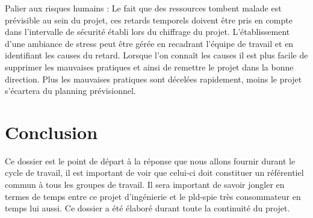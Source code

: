 Palier aux risques humains : Le fait que des ressources tombent malade est prévisible au sein du projet, ces retards temporels doivent être pris en compte dans l'intervalle de sécurité établi lors du chiffrage du projet. L'établissement d'une ambiance de stress peut être gérée en recadrant l'équipe de travail et en identifiant les causes du retard. Lorsque l'on connaît les causes il est plus facile de supprimer les mauvaises pratiques et ainsi de remettre le projet dans la bonne direction. Plus les mauvaises pratiques sont décelées rapidement, moins le projet s'écartera du planning prévisionnel.   

    
    \section{Conclusion}

Ce dossier est le point de départ à la réponse que nous allons fournir durant le cycle de travail, il est important de voir que celui-ci doit constituer un référentiel commun à tous les groupes de travail. Il sera important de savoir jongler en termes de temps entre ce projet d'ingénierie et le pld-spie très consommateur en temps lui aussi. Ce dossier a été élaboré durant toute la continuité du projet.   
